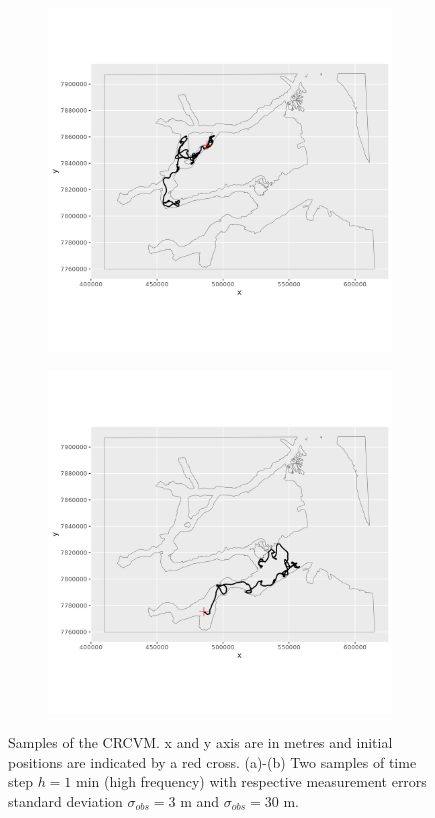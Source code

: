 \documentclass[11pt]{article}
\newcommand {\1}{\mathbb{1}}
\begin{document}
\begin{figure}[H]
	\centering
	\begin{subfigure}{0.48\textwidth}
		\centering
		\includegraphics[scale=0.5]{images/simulation study/samples_fjords_hf_ne_omega.png}
		\caption{}
	\end{subfigure}
	\begin{subfigure}{0.48\textwidth}
		\centering
		\includegraphics[scale=0.5]{images/simulation study/samples_fjords_hf_e_omega.png}
		\caption{}
	\end{subfigure}
	\caption{Samples of the CRCVM. x and y axis are in metres and initial positions are indicated by a red cross. (a)-(b) Two samples of time step $h=1$ min (high frequency) with respective measurement errors standard deviation $\sigma_{obs}=3$ m and $\sigma_{obs}=30$ m.}
	\label{fig: samples_fjords_CRCVM}
\end{figure}
\end{document}

